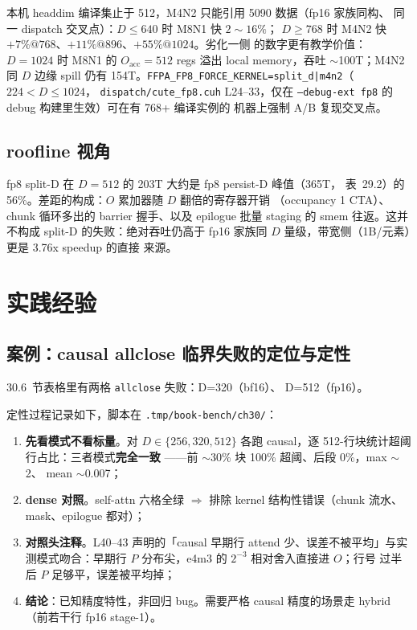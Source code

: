 本机 headdim 编译集止于 512，M4N2 只能引用 5090 数据（fp16 家族同构、
同一 dispatch 交叉点）：$D\le640$ 时 M8N1 快 $2\sim16\%$；
$D\ge768$ 时 M4N2 快 $+7\%@768$、$+11\%@896$、$+55\%@1024$。劣化一侧
的数字更有教学价值：$D=1024$ 时 M8N1 的 $O_{\text{acc}}=512$ regs
溢出 local memory，吞吐 $\sim$100T；M4N2 同 $D$ 边缘 spill 仍有
154T。\texttt{FFPA\_FP8\_FORCE\_KERNEL=split\_d|m4n2}（$224<D\le1024$，
\texttt{dispatch/cute\_fp8.cuh} L24--33，仅在 \texttt{--debug-ext fp8}
的 debug 构建里生效）可在有 768+ 编译实例的
机器上强制 A/B 复现交叉点。

\subsection{roofline 视角}

fp8 split-D 在 $D=512$ 的 203T 大约是 fp8 persist-D 峰值（365T，
表~29.2）的 56\%。差距的构成：$O$ 累加器随 $D$ 翻倍的寄存器开销
（occupancy 1 CTA）、chunk 循环多出的 barrier 握手、以及 epilogue
批量 staging 的 smem 往返。这并不构成 split-D 的失败：绝对吞吐仍高于
fp16 家族同 $D$ 量级，带宽侧（1B/元素）更是 3.76x speedup 的直接
来源。

\section{实践经验}

\subsection{案例：causal allclose 临界失败的定位与定性}

30.6~节表格里有两格 \texttt{allclose} 失败：D=320（bf16）、
D=512（fp16）。

定性过程记录如下，脚本在 \texttt{.tmp/book-bench/ch30/}：

\begin{enumerate}[itemsep=0pt,topsep=2pt]
  \item \textbf{先看模式不看标量}。对 $D\in\{256,320,512\}$ 各跑
        causal，逐 512-行块统计超阈行占比：三者模式\textbf{完全一致}
        ——前 $\sim$30\% 块 100\% 超阈、后段 0\%，max $\sim$2、
        mean $\sim$0.007；
  \item \textbf{dense 对照}。self-attn 六格全绿 $\Rightarrow$ 排除
        kernel 结构性错误（chunk 流水、mask、epilogue 都对）；
  \item \textbf{对照头注释}。L40--43 声明的「causal 早期行
        attend 少、误差不被平均」与实测模式吻合：早期行
        $P$ 分布尖，e4m3 的 $2^{-3}$ 相对舍入直接进 $O$；行号
        过半后 $P$ 足够平，误差被平均掉；
  \item \textbf{结论}：已知精度特性，非回归 bug。需要严格
        causal 精度的场景走 hybrid（前若干行 fp16 stage-1）。
\end{enumerate}

